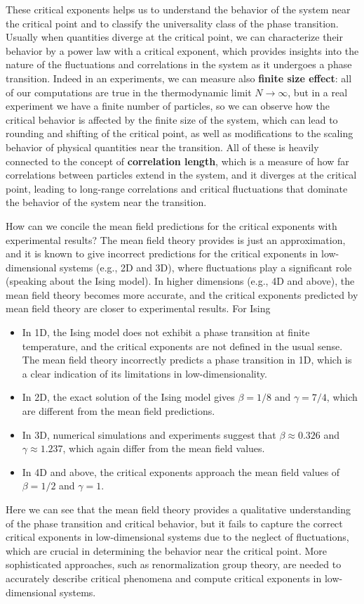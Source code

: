 These critical exponents helps us to understand the behavior of the system near the critical point and to classify the universality class of the phase transition. Usually when quantities diverge at the critical point, we can characterize their behavior by a power law with a critical exponent, which provides insights into the nature of the fluctuations and correlations in the system as it undergoes a phase transition. Indeed in an experiments, we can measure also \textbf{finite size effect}: all of our computations are true in the thermodynamic limit \(N \to \infty\), but in a real experiment we have a finite number of particles, so we can observe how the critical behavior is affected by the finite size of the system, which can lead to rounding and shifting of the critical point, as well as modifications to the scaling behavior of physical quantities near the transition. All of these is heavily connected to the concept of \textbf{correlation length}, which is a measure of how far correlations between particles extend in the system, and it diverges at the critical point, leading to long-range correlations and critical fluctuations that dominate the behavior of the system near the transition.

How can we concile the mean field predictions for the critical exponents with experimental results? The mean field theory provides is just an approximation, and it is known to give incorrect predictions for the critical exponents in low-dimensional systems (e.g., 2D and 3D), where fluctuations play a significant role (speaking about the Ising model). In higher dimensions (e.g., 4D and above), the mean field theory becomes more accurate, and the critical exponents predicted by mean field theory are closer to experimental results. For Ising
\begin{itemize}
    \item In 1D, the Ising model does not exhibit a phase transition at finite temperature, and the critical exponents are not defined in the usual sense. The mean field theory incorrectly predicts a phase transition in 1D, which is a clear indication of its limitations in low-dimensionality.
    \item In 2D, the exact solution of the Ising model gives \(\beta = 1/8\) and \(\gamma = 7/4\), which are different from the mean field predictions.
    \item In 3D, numerical simulations and experiments suggest that \(\beta \approx 0.326\) and \(\gamma \approx 1.237\), which again differ from the mean field values.
    \item In 4D and above, the critical exponents approach the mean field values of \(\beta = 1/2\) and \(\gamma = 1\).
\end{itemize}
Here we can see that the mean field theory provides a qualitative understanding of the phase transition and critical behavior, but it fails to capture the correct critical exponents in low-dimensional systems due to the neglect of fluctuations, which are crucial in determining the behavior near the critical point. More sophisticated approaches, such as renormalization group theory, are needed to accurately describe critical phenomena and compute critical exponents in low-dimensional systems.

